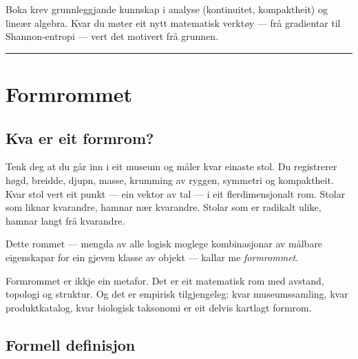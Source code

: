 \documentclass[10pt]{book}
\theoremstyle{definition}
\theoremstyle{plain}
\theoremstyle{remark}
\begin{document}
Boka krev grunnleggjande kunnskap i analyse (kontinuitet, kompaktheit) og lineær algebra. Kvar du m\o ter eit nytt matematisk verkt\o y --- fr\aa{} gradientar til Shannon-entropi --- vert det motivert fr\aa{} grunnen.

\bigskip
\begin{center}
\rule{4cm}{0.4pt}
\end{center}


\chapter{Formrommet}\label{kap:formrom}

\section{Kva er eit formrom?}\label{sec:formrom:intuisjon}

Tenk deg at du g\aa r inn i eit museum og m\aa ler kvar einaste stol. Du registrerer h\o gd, breidde, djupn, masse, krumming av ryggen, symmetri og kompaktheit. Kvar stol vert eit punkt --- ein vektor av tal --- i eit flerdimensjonalt rom. Stolar som liknar kvarandre, hamnar n\ae r kvarandre. Stolar som er radikalt ulike, hamnar langt fr\aa{} kvarandre.

Dette rommet --- mengda av alle logisk moglege kombinasjonar av m\aa lbare eigenskapar for ein gjeven klasse av objekt --- kallar me \emph{formrommet}.

Formrommet er ikkje ein metafor. Det er eit matematisk rom med avstand, topologi og struktur. Og det er empirisk tilgjengeleg: kvar museumssamling, kvar produktkatalog, kvar biologisk taksonomi er eit delvis kartlagt formrom.

\section{Formell definisjon}\label{sec:formrom:def}
\end{document}
